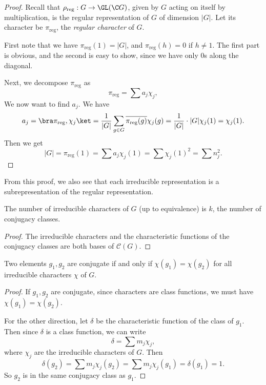 \documentclass[a4paper]{article}
\begin{document}
\begin{proof}
  Recall that $\rho_{\mathrm{reg}}: G \to \GL(\C G)$, given by $G$ acting on itself by multiplication, is the regular representation of $G$ of dimension $|G|$. Let its character be $\pi_{\mathrm{reg}}$, the \emph{regular character} of $G$.

  First note that we have $\pi_{\mathrm{reg}}(1) = |G|$, and $\pi_{\mathrm{reg}}(h) = 0$ if $h\not= 1$. The first part is obvious, and the second is easy to show, since we have only $0$s along the diagonal.

  Next, we decompose $\pi_{\mathrm{reg}}$ as
  \[
    \pi_{\mathrm{reg}} = \sum a_j \chi_j,
  \]
  We now want to find $a_j$. We have
  \[
    a_j = \bra \pi_{\mathrm{reg}}, \chi_j\ket = \frac{1}{|G|} \sum_{g \in G} \overline{\pi_{\mathrm{reg}}(g)} \chi_j(g) = \frac{1}{|G|} \cdot |G| \chi_j(1) = \chi_j(1).
  \]
  Then we get
  \[
    |G| = \pi_{\mathrm{reg}}(1) = \sum a_j \chi_j(1) = \sum \chi_j(1)^2 = \sum n_j^2.
  \]
\end{proof}
From this proof, we also see that each irreducible representation is a subrepresentation of the regular representation.

\begin{cor}
  The number of irreducible characters of $G$ (up to equivalence) is $k$, the number of conjugacy classes.
\end{cor}

\begin{proof}
  The irreducible characters and the characteristic functions of the conjugacy classes are both bases of $\mathcal{C}(G)$.
\end{proof}

\begin{cor}
  Two elements $g_1, g_2$ are conjugate if and only if $\chi(g_1) = \chi(g_2)$ for all irreducible characters $\chi$ of $G$.
\end{cor}

\begin{proof}
  If $g_1, g_2$ are conjugate, since characters are class functions, we must have $\chi(g_1) = \chi(g_2)$.

  For the other direction, let $\delta$ be the characteristic function of the class of $g_1$. Then since $\delta$ is a class function, we can write
  \[
    \delta = \sum m_j \chi_j,
  \]
  where $\chi_j$ are the irreducible characters of $G$. Then
  \[
    \delta(g_2) = \sum m_j \chi_j(g_2) = \sum m_j \chi_j(g_1) = \delta(g_1) = 1.
  \]
  So $g_2$ is in the same conjugacy class as $g_1$.
\end{proof}
\end{document}
